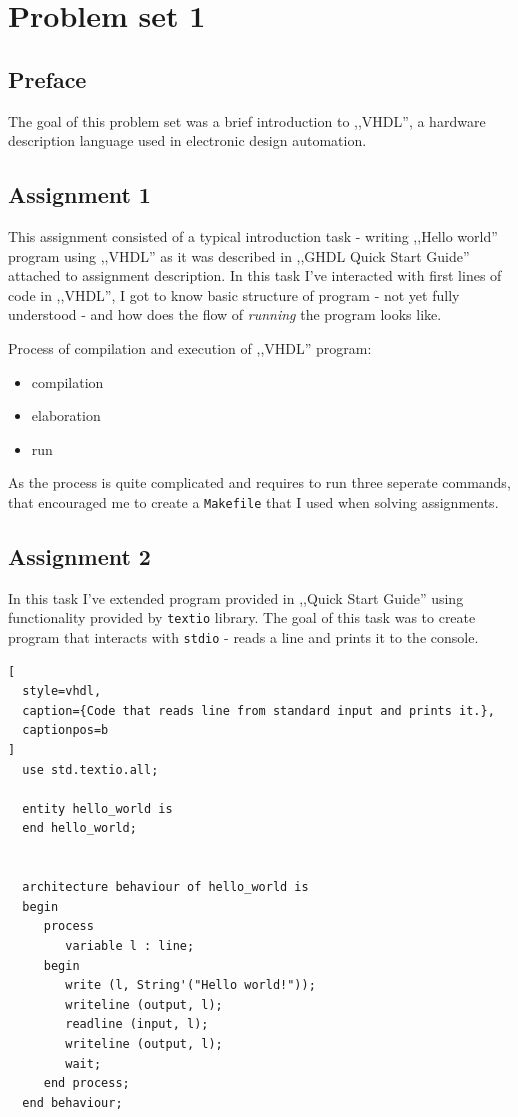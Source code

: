 \section{Problem set 1}
\subsection{Preface}

The goal of this problem set was a brief introduction to ,,VHDL'', a hardware
description language used in electronic design automation.

\subsection{Assignment 1}

This assignment consisted of a typical introduction task - writing
,,Hello world'' program using ,,VHDL'' as it was described in ,,GHDL Quick Start
Guide'' attached to assignment description. In this task I've interacted
with first lines of code in ,,VHDL'', I got to know basic structure of program
- not yet fully understood - and how does the flow of \textit{running} the
program looks like.

Process of compilation and execution of ,,VHDL'' program:
\begin{itemize}
  \item compilation
  \item elaboration
  \item run
\end{itemize}
As the process is quite complicated and requires to run three seperate commands,
that encouraged me to create a \texttt{Makefile} that I used when solving
assignments.

\subsection{Assignment 2}

In this task I've extended program provided in ,,Quick Start Guide'' using
functionality provided by \texttt{textio} library. The goal of this task was to
create program that interacts with \texttt{stdio} - reads a line and prints it
to the console.


\begin{lstlisting}[
  style=vhdl,
  caption={Code that reads line from standard input and prints it.},
  captionpos=b
]
  use std.textio.all;

  entity hello_world is
  end hello_world;


  architecture behaviour of hello_world is
  begin
     process
        variable l : line;
     begin
        write (l, String'("Hello world!"));
        writeline (output, l);
        readline (input, l);
        writeline (output, l);
        wait;
     end process;
  end behaviour;
\end{lstlisting}

